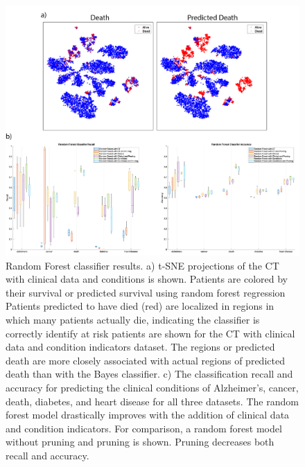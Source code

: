 \documentclass{article}
\begin{document}
\begin{figure}[ht!]
\centering
\includegraphics[width=.98\textwidth]{results/figure_2.jpg}
\caption{Random Forest classifier results. a) t-SNE projections of the CT with clinical data and conditions is shown. Patients are colored by their survival or predicted survival using random forest regression  Patients predicted to have died (red) are localized in regions in which many patients actually die, indicating the classifier is correctly identify at risk patients are shown for the CT with clinical data and condition indicators dataset. The regions or predicted death are more closely associated with actual regions of predicted death than with the Bayes classifier. c) The classification recall and accuracy for predicting the clinical conditions of Alzheimer's, cancer, death, diabetes, and heart disease for all three datasets. The random forest model drastically improves with the addition of clinical data and condition indicators. For comparison, a random forest model without pruning and pruning is shown. Pruning decreases both recall and accuracy.}
\end{figure} 
\end{document}
